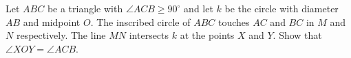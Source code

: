Let $ABC$ be a triangle with $\angle ACB \geq 90^\circ$ and let $k$ be the circle with
diameter $AB$ and midpoint $O$. The inscribed circle of $ABC$ touches
$AC$ and $BC$ in $M$ and $N$ respectively. The line $MN$ intersects $k$ at the points $X$ and $Y$.
Show that $\angle XOY = \angle ACB$.